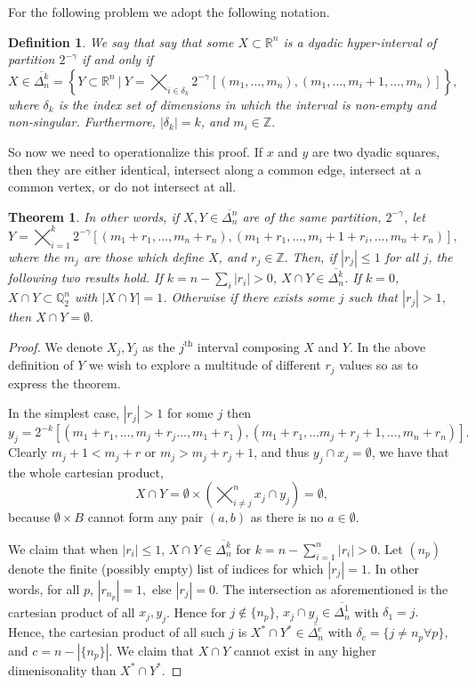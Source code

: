 \documentclass[letter]{article}
\newtheorem{theorem}{Theorem}
\newtheorem{definition}{Definition}
\newenvironment{menumerate}{%
  \edef\backupindent{\the\parindent}%
  \enumerate%
  \setlength{\parindent}{\backupindent}%
}{\endenumerate}
\begin{document}
\begin{menumerate}
\begin{menumerate}
 			\item For the following problem we adopt the following notation.
 				\begin{definition}
 				 We say that say that some $X \subset \mathbb{R}^n$ is a dyadic hyper-interval of partition $2^{-\gamma}$ if and only if 
 				 $$X \in \overline{\Delta_n^k} = \left\{ Y \subset \mathbb{R}^n\ |\ Y = \bigtimes_{i\in\delta_k}2^{-\gamma}\left[(m_1,\dots,m_n),(m_1 , \dots,m_i +1,\dots, m_n)\right]\right\}, $$
 				 where $\delta_k$ is the index set of dimensions in which the interval is non-empty and non-singular. Furthermore, $|\delta_k| = k$, and $m_i \in \mathbb{Z}.$
 				\end{definition}
 					So now we need to operationalize this proof. If $x$ and $y$ are two dyadic squares, then they are either identical, intersect along a common edge, intersect at a common vertex, or do not intersect at all.
				\begin{theorem}
					  In other words, if $X,Y \in \overline{\Delta_n^n}$ are of the same partition, $2^{-\gamma}$, let
					   $$Y = \bigtimes_{i=1}^k2^{-\gamma}\left[(m_1 + r_1,\dots,m_n + r_n),(m_1 + r_1, \dots,m_i +1 + r_i,\dots, m_n + r_n)\right],$$ 
					   where the $m_j$ are those which define $X$, and $r_j \in \mathbb{Z}.$ Then, if $|r_j| \leq 1$ for all $j$, the following two results hold. If $k = n - \sum_i|r_i| > 0$,  $X \cap Y \in \overline{\Delta_n^k}$. If $k = 0$, $X \cap Y \subset \mathbb{Q}_2^n$ with $|X\cap Y| = 1$. Otherwise if there exists some $j$ such that $|r_j| > 1$, then $X \cap Y = \emptyset.$

				\end{theorem}
				\begin{proof}
					We denote $X_j, Y_j$ as the $j^\mathrm{th}$ interval composing $X$ and $Y$. In the above definition of $Y$ we wish to explore a multitude of different $r_j$ values so as to express the theorem.

					In the simplest case, $|r_j| > 1$ for some $j$ then $$y_j = 2^{-k}[(m_1 + r_1,\dots,m_j + r_j\dots,m_1+r_1),(m_1+r_1,\dots m_j+r_j+1,\dots,m_n+r_n)].$$ Clearly $m_j + 1 < m_j + r$ or $m_j  > m_j +r_j + 1$, and thus $y_j \cap x_j = \emptyset$, we have that the whole cartesian product, 
						$$X\cap Y = \emptyset \times \left(\bigtimes_{i\neq j}^n x_j\cap y_j\right) = \emptyset,$$ 
						because $\emptyset \times B$ cannot form any pair $(a,b)$ as there is no $a\in\emptyset.$

					We claim that when $|r_i| \leq 1 $, $X \cap Y\in \overline{\Delta_n^k}$ for $k = n - \sum_{i=1}^n|r_i| > 0.$ Let $(n_p)$ denote the finite (possibly empty) list of indices for which $|r_j| = 1.$ In other words, for all $p$, $|r_{n_p}| = 1,$ else $|r_j| = 0.$ The intersection as aforementioned is the cartesian product of all $x_j, y_j$. Hence for $j \notin \{n_p\}$,  $x_j \cap y_j \in \overline{\Delta_n^1}$ with $\delta_1 = {j}.$ Hence, the cartesian product of all such $j$ is $X^* \cap Y^* \in \overline{\Delta_n^c}$ with $\delta_{c} = \{j \neq n_p \forall p\},$ and $c= n-|\{n_p\}|.$ We claim that $X \cap Y$ cannot exist in any higher dimenisonality than $X^* \cap Y^*.$ 


\end{proof}
\end{menumerate}
\end{menumerate}
\end{document}
